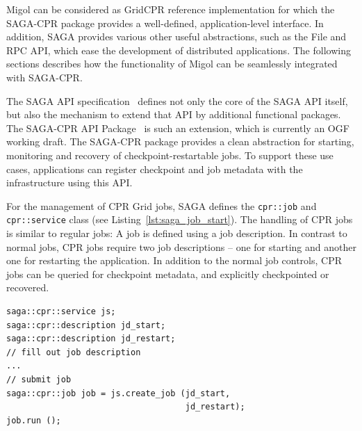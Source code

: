 \documentclass[times, 10pt, twocolumn]{article}
\newcommand{\up}{\vspace*{-1em}}
\begin{document}
Migol can be considered as GridCPR reference implementation for which
the SAGA-CPR package provides a well-defined, application-level
interface.  In addition, SAGA provides various other useful
abstractions, such as the File and RPC API, which ease the development
of distributed applications. The following sections describes how the
functionality of Migol can be seamlessly integrated with SAGA-CPR.





\up The SAGA API specification~\cite{saga_gfd90} defines not only the
core of the SAGA API itself, but also the mechanism to extend that API
by additional functional packages.  The SAGA-CPR API
Package~\cite{saga_cpr_draft} is such an extension, which is currently
an OGF working draft.  The SAGA-CPR package provides a clean
abstraction for starting, monitoring and recovery of
checkpoint-restartable jobs.
To support these use cases, applications can register checkpoint and job metadata with the infrastructure using this API. 

For the management of CPR Grid jobs, SAGA defines the \texttt{cpr::job} and \texttt{cpr::service} class (see 
Listing~\ref{lst:saga_job_start}). The handling of 
CPR jobs is similar to regular jobs: A job is defined using a job description. In contrast to normal jobs, 
CPR jobs require  two job descriptions -- one for starting and another one for restarting the application.
In addition to the normal job controls, CPR jobs can be queried for checkpoint metadata, 
and explicitly checkpointed or recovered. 


\begin{lstlisting}[style=myListing, caption={\small \bf SAGA-CPR: Starting a Job}, float=t, label={lst:saga_job_start}]
saga::cpr::service js; 
saga::cpr::description jd_start;
saga::cpr::description jd_restart;
// fill out job description
...
// submit job  
saga::cpr::job job = js.create_job (jd_start, 
                                    jd_restart);
job.run ();
\end{lstlisting}
\end{document}
